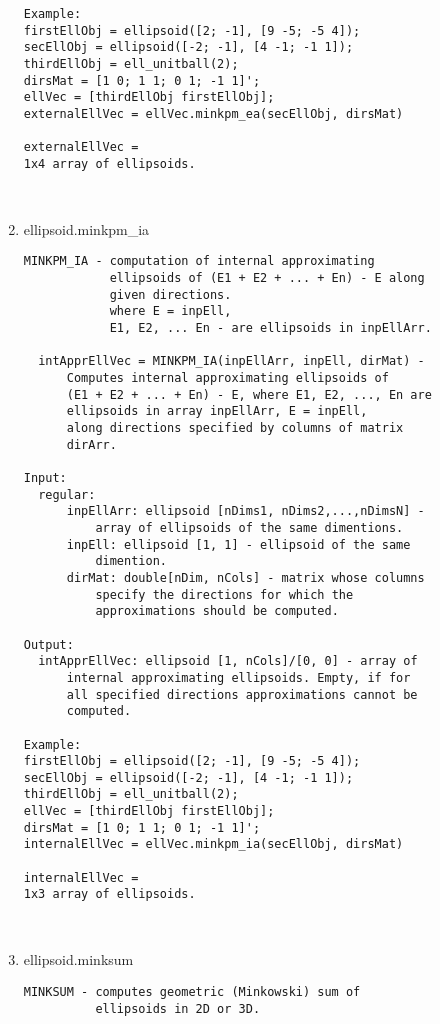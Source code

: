 \begin{enumerate}
\begin{lstlisting}
Example:
firstEllObj = ellipsoid([2; -1], [9 -5; -5 4]);
secEllObj = ellipsoid([-2; -1], [4 -1; -1 1]);
thirdEllObj = ell_unitball(2);
dirsMat = [1 0; 1 1; 0 1; -1 1]';
ellVec = [thirdEllObj firstEllObj];
externalEllVec = ellVec.minkpm_ea(secEllObj, dirsMat)

externalEllVec =
1x4 array of ellipsoids.



\end{lstlisting}
\fontfamily{\familydefault}
\selectfont
\item {ellipsoid.minkpm\_ia}
\selectfont
\begin{lstlisting}
MINKPM_IA - computation of internal approximating
            ellipsoids of (E1 + E2 + ... + En) - E along
            given directions.
            where E = inpEll,
            E1, E2, ... En - are ellipsoids in inpEllArr.

  intApprEllVec = MINKPM_IA(inpEllArr, inpEll, dirMat) -
      Computes internal approximating ellipsoids of
      (E1 + E2 + ... + En) - E, where E1, E2, ..., En are
      ellipsoids in array inpEllArr, E = inpEll,
      along directions specified by columns of matrix
      dirArr.

Input:
  regular:
      inpEllArr: ellipsoid [nDims1, nDims2,...,nDimsN] -
          array of ellipsoids of the same dimentions.
      inpEll: ellipsoid [1, 1] - ellipsoid of the same
          dimention.
      dirMat: double[nDim, nCols] - matrix whose columns
          specify the directions for which the
          approximations should be computed.

Output:
  intApprEllVec: ellipsoid [1, nCols]/[0, 0] - array of
      internal approximating ellipsoids. Empty, if for
      all specified directions approximations cannot be
      computed.

Example:
firstEllObj = ellipsoid([2; -1], [9 -5; -5 4]);
secEllObj = ellipsoid([-2; -1], [4 -1; -1 1]);
thirdEllObj = ell_unitball(2);
ellVec = [thirdEllObj firstEllObj];
dirsMat = [1 0; 1 1; 0 1; -1 1]';
internalEllVec = ellVec.minkpm_ia(secEllObj, dirsMat)

internalEllVec =
1x3 array of ellipsoids.



\end{lstlisting}
\fontfamily{\familydefault}
\selectfont
\item {ellipsoid.minksum}
\selectfont
\begin{lstlisting}
MINKSUM - computes geometric (Minkowski) sum of
          ellipsoids in 2D or 3D.


\end{lstlisting}
\end{enumerate}
